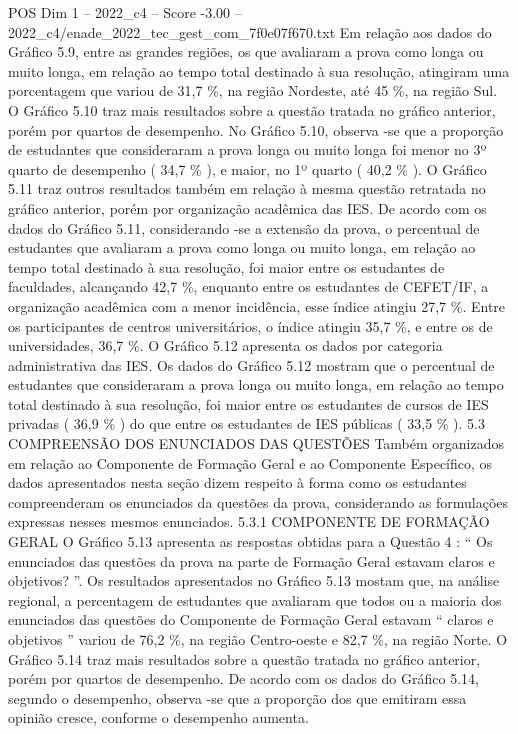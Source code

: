 \begin{textsample}{POS Dim 1 – 2022\_c4 – Score -3.00 – 2022\_c4/enade\_2022\_tec\_gest\_com\_7f0e07f670.txt}
Em relação aos dados do Gráfico 5.9, entre as grandes regiões, os que avaliaram a prova como longa ou muito longa, em relação ao tempo total destinado à sua resolução, atingiram uma porcentagem que variou de 31,7 \%, na região Nordeste, até 45 \%, na região Sul.
O Gráfico 5.10 traz mais resultados sobre a questão tratada no gráfico anterior, porém por quartos de desempenho.
No Gráfico 5.10, observa -se que a proporção de estudantes que consideraram a prova longa ou muito longa foi menor no 3º quarto de desempenho ( 34,7 \% ), e maior, no 1º quarto ( 40,2 \% ).
O Gráfico 5.11 traz outros resultados também em relação à mesma questão retratada no gráfico anterior, porém por organização acadêmica das IES.
De acordo com os dados do Gráfico 5.11, considerando -se a extensão da prova, o percentual de estudantes que avaliaram a prova como longa ou muito longa, em relação ao tempo total destinado à sua resolução, foi maior entre os estudantes de faculdades, alcançando 42,7 \%, enquanto entre os estudantes de CEFET/IF, a organização acadêmica com a menor incidência, esse índice atingiu 27,7 \%.
Entre os participantes de centros universitários, o índice atingiu 35,7 \%, e entre os de universidades, 36,7 \%.
O Gráfico 5.12 apresenta os dados por categoria administrativa das IES.
Os dados do Gráfico 5.12 mostram que o percentual de estudantes que consideraram a prova longa ou muito longa, em relação ao tempo total destinado à sua resolução, foi maior entre os estudantes de cursos de IES privadas ( 36,9 \% ) do que entre os estudantes de IES públicas ( 33,5 \% ). 5.3 COMPREENSÃO DOS ENUNCIADOS DAS QUESTÕES Também organizados em relação ao Componente de Formação Geral e ao Componente Específico, os dados apresentados nesta seção dizem respeito à forma como os estudantes compreenderam os enunciados da questões da prova, considerando as formulações expressas nesses mesmos enunciados. 5.3.1 COMPONENTE DE FORMAÇÃO GERAL O Gráfico 5.13 apresenta as respostas obtidas para a Questão 4 : “ Os enunciados das questões da prova na parte de Formação Geral estavam claros e objetivos? ”.
Os resultados apresentados no Gráfico 5.13 mostam que, na análise regional, a percentagem de estudantes que avaliaram que todos ou a maioria dos enunciados das questões do Componente de Formação Geral estavam “ claros e objetivos ” variou de 76,2 \%, na região Centro-oeste e 82,7 \%, na região Norte.
O Gráfico 5.14 traz mais resultados sobre a questão tratada no gráfico anterior, porém por quartos de desempenho.
De acordo com os dados do Gráfico 5.14, segundo o desempenho, observa -se que a proporção dos que emitiram essa opinião cresce, conforme o desempenho aumenta.

\end{textsample}
